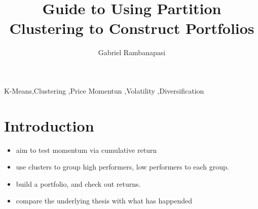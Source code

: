 \documentclass[11pt,preprint, authoryear]{elsarticle}
\numberwithin{equation}{section}
\numberwithin{figure}{section}
\numberwithin{table}{section}
\def\tightlist{} %
\begin{document}
\begin{frontmatter}  %

\title{Guide to Using Partition Clustering to Construct Portfolios}





\author[Add1]{Gabriel Rambanapasi}





\address[Add1]{Stellenbosch University, Stellenbosch, South Africa}



\vspace{1cm}


\begin{keyword}
\footnotesize{
K-Means\sep Clustering \sep Price Momentun \sep Volatility
\sep Diversification \\
\vspace{0.3cm}
}
\end{keyword}



\vspace{0.5cm}

\end{frontmatter}

\setcounter{footnote}{0}



\pagestyle{fancy}
\chead{}
\rhead{}
\lfoot{}
\lhead{}
\cfoot{}


\headsep 35pt %




\hypertarget{introduction}{%
\section{\texorpdfstring{Introduction
\label{Introduction}}{Introduction }}\label{introduction}}

\begin{itemize}
\tightlist
\item
  aim to test momentum via cumulative return
\item
  use clusters to group high performers, low performers to each group.
\item
  build a portfolio, and check out returns.
\item
  compare the underlying thesis with what has happended
\end{itemize}
\end{document}
